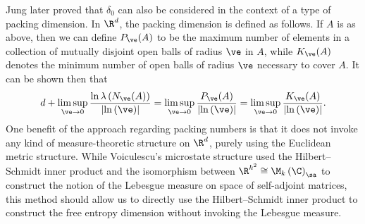 \documentclass[10pt]{mypackage}
\begin{document}
Jung later proved that $\delta_0$ can also be considered in the context of a type of packing dimension. In $\R^{d}$, the packing dimension is defined as follows. If $A$ is as above, then we can define $P_{\ve}(A)$ to be the maximum number of elements in a collection of mutually disjoint open balls of radius $\ve$ in $A$, while $K_{\ve}(A)$ denotes the minimum number of open balls of radius $\ve$ necessary to cover $A$. It can be shown then that
\begin{align*}
  d + \limsup_{\ve\rightarrow 0} \frac{\ln \lambda \left( N_{\ve}(A) \right)}{\left\vert \ln\left( \ve \right) \right\vert} = \limsup_{\ve\rightarrow 0} \frac{P_{\ve}(A)}{\left\vert \ln\left( \ve \right) \right\vert} = \limsup_{\ve\rightarrow 0} \frac{K_{\ve}(A)}{\left\vert \ln\left( \ve \right) \right\vert}.
\end{align*}
One benefit of the approach regarding packing numbers is that it does not invoke any kind of measure-theoretic structure on $\R^{d}$, purely using the Euclidean metric structure. While Voiculescu's microstate structure used the Hilbert--Schmidt inner product and the isomorphism between $\R^{k^2}\cong \M_k\left( \C \right)_{\sa}$ to construct the notion of the Lebesgue measure on space of self-adjoint matrices, this method should allow us to directly use the Hilbert--Schmidt inner product to construct the free entropy dimension without invoking the Lebesgue measure.
\end{document}
